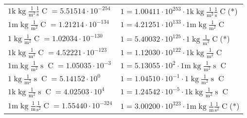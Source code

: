 \begin{center}
\begin{longtable}{l l}
{\color{gray}$1 \bm{\mathrm{ k}}\operatorname{kg}\frac1{\operatorname{m}^2}\frac1{\operatorname{s}}{\operatorname{C}}{} = 5.51514\cdot10^{-254} $}   & {\color{gray}$ 1 = 1.00411\cdot10^{253} \cdot 1 \bm{\mathrm{ k}}\operatorname{kg}\frac1{\operatorname{m}^2}\frac1{\operatorname{s}}{\operatorname{C}}{}$}\quad(*)\\
{\color{gray}$1 \bm{\mathrm{ m}}\operatorname{kg}\frac1{\operatorname{m}^2}{}{\operatorname{C}}{} = 1.21214\cdot10^{-134} $}   & {\color{gray}$ 1 = 4.21251\cdot10^{133} \cdot 1 \bm{\mathrm{ m}}\operatorname{kg}\frac1{\operatorname{m}^2}{}{\operatorname{C}}{}$}  \\
{\color{black}$1 \bm{\mathrm{ }}\operatorname{kg}\frac1{\operatorname{m}^2}{}{\operatorname{C}}{} = 1.02034\cdot10^{-130} $}   & {\color{black}$ 1 = 5.40032\cdot10^{125} \cdot 1 \bm{\mathrm{ }}\operatorname{kg}\frac1{\operatorname{m}^2}{}{\operatorname{C}}{}$}\quad(*)\\
{\color{gray}$1 \bm{\mathrm{ k}}\operatorname{kg}\frac1{\operatorname{m}^2}{}{\operatorname{C}}{} = 4.52221\cdot10^{-123} $}   & {\color{gray}$ 1 = 1.12030\cdot10^{122} \cdot 1 \bm{\mathrm{ k}}\operatorname{kg}\frac1{\operatorname{m}^2}{}{\operatorname{C}}{}$}  \\
{\color{gray}$1 \bm{\mathrm{ m}}\operatorname{kg}\frac1{\operatorname{m}^2}{\operatorname{s}}{\operatorname{C}}{} = 1.05035\cdot10^{-3} $}   & {\color{gray}$ 1 = 5.13055\cdot10^{2} \cdot 1 \bm{\mathrm{ m}}\operatorname{kg}\frac1{\operatorname{m}^2}{\operatorname{s}}{\operatorname{C}}{}$}  \\
{\color{black}$1 \bm{\mathrm{ }}\operatorname{kg}\frac1{\operatorname{m}^2}{\operatorname{s}}{\operatorname{C}}{} = 5.14152\cdot10^{0} $}   & {\color{black}$ 1 = 1.04510\cdot10^{-1} \cdot 1 \bm{\mathrm{ }}\operatorname{kg}\frac1{\operatorname{m}^2}{\operatorname{s}}{\operatorname{C}}{}$}  \\
{\color{gray}$1 \bm{\mathrm{ k}}\operatorname{kg}\frac1{\operatorname{m}^2}{\operatorname{s}}{\operatorname{C}}{} = 4.02503\cdot10^{4} $}   & {\color{gray}$ 1 = 1.24542\cdot10^{-5} \cdot 1 \bm{\mathrm{ k}}\operatorname{kg}\frac1{\operatorname{m}^2}{\operatorname{s}}{\operatorname{C}}{}$}  \\
{\color{gray}$1 \bm{\mathrm{ m}}\operatorname{kg}\frac1{\operatorname{m}}\frac1{\operatorname{s}^2}{\operatorname{C}}{} = 1.55440\cdot10^{-324} $}   & {\color{gray}$ 1 = 3.00200\cdot10^{323} \cdot 1 \bm{\mathrm{ m}}\operatorname{kg}\frac1{\operatorname{m}}\frac1{\operatorname{s}^2}{\operatorname{C}}{}$}\quad(*)\\

\end{longtable}
\end{center}
